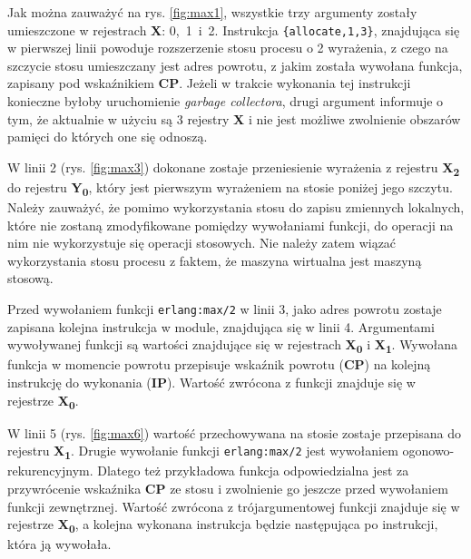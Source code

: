 Jak można zauważyć na rys. \ref{fig:max1}, wszystkie trzy argumenty zostały umieszczone w rejestrach \textbf{X}: 0,~1~i~2. Instrukcja \texttt{\{allocate,1,3\}}, znajdująca się w pierwszej linii powoduje rozszerzenie stosu procesu o 2 wyrażenia, z czego na szczycie stosu umieszczany jest adres powrotu, z jakim została wywołana funkcja, zapisany pod wskaźnikiem \textbf{CP}. Jeżeli w trakcie wykonania tej instrukcji konieczne byłoby uruchomienie \emph{garbage collectora}, drugi argument informuje o tym, że aktualnie w użyciu są 3 rejestry \textbf{X} i nie jest możliwe zwolnienie obszarów pamięci do których one się odnoszą.

W linii 2 (rys. \ref{fig:max3}) dokonane zostaje przeniesienie wyrażenia z rejestru \textbf{X\textsubscript{2}} do rejestru \textbf{Y\textsubscript{0}}, który jest pierwszym wyrażeniem na stosie poniżej jego szczytu.
Należy zauważyć, że pomimo wykorzystania stosu do zapisu zmiennych lokalnych, które nie zostaną zmodyfikowane pomiędzy wywołaniami funkcji, do operacji na nim nie wykorzystuje się operacji stosowych.
Nie należy zatem wiązać wykorzystania stosu procesu z faktem, że maszyna wirtualna jest maszyną stosową.

Przed wywołaniem funkcji \texttt{erlang:max/2} w linii 3, jako adres powrotu zostaje zapisana kolejna instrukcja w module, znajdująca się w linii 4. Argumentami wywoływanej funkcji są wartości znajdujące się w rejestrach \textbf{X\textsubscript{0}} i \textbf{X\textsubscript{1}}. Wywołana funkcja w momencie powrotu przepisuje wskaźnik powrotu (\textbf{CP}) na kolejną instrukcję do wykonania (\textbf{IP}). Wartość zwrócona z funkcji znajduje się w rejestrze \textbf{X\textsubscript{0}}. 

W linii 5 (rys. \ref{fig:max6}) wartość przechowywana na stosie zostaje przepisana do rejestru \textbf{X\textsubscript{1}}.
Drugie wywołanie funkcji \texttt{erlang:max/2} jest wywołaniem ogonowo-rekurencyjnym.
Dlatego też przykładowa funkcja odpowiedzialna jest za przywrócenie wskaźnika \textbf{CP} ze stosu i zwolnienie go jeszcze przed wywołaniem funkcji zewnętrznej. 
Wartość zwrócona z trójargumentowej funkcji znajduje się w rejestrze \textbf{X\textsubscript{0}}, a kolejna wykonana instrukcja będzie następująca po instrukcji, która ją wywołała.

